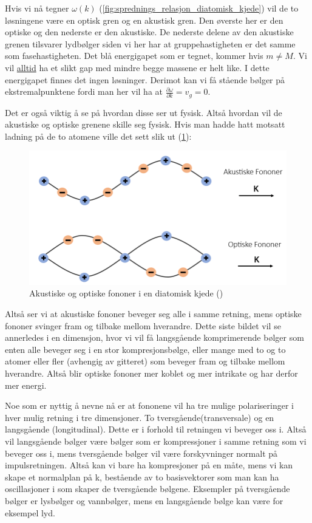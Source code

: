 \documentclass{article}
\begin{document}
Hvis vi nå tegner $\omega(k)$ (\ref{fig:sprednings_relasjon_diatomisk_kjede}) vil de to løsningene være en optisk gren og en akustisk gren. Den øverste her er den optiske og den nederste er den akustiske. De nederste delene av den akustiske grenen tilsvarer lydbølger siden vi her har at gruppehastigheten er det samme som fasehastigheten. Det blå energigapet som er tegnet, kommer hvis $m \ne M$. Vi vil \underline{alltid} ha et slikt gap med mindre begge massene er helt like. I dette energigapet finnes det ingen løsninger. Derimot kan vi få stående bølger på ekstremalpunktene fordi man her vil ha at $\frac{\partial \omega}{\partial k} = v_g = 0$.

Det er også viktig å se på hvordan disse ser ut fysisk. Altså hvordan vil de akustiske og optiske grenene skille seg fysisk. Hvis man hadde hatt motsatt ladning på de to atomene ville det sett slik ut (\ref{fig:akustiske_og_optiske_fononer_diatomisk_kjede}):
\begin{figure}[H]
    \centering
    \includegraphics[width=0.5\linewidth]{bilder/akustiske_og_optiske_fononer_diatomisk_kjede.png}
    \caption{Akustiske og optiske fononer i en diatomisk kjede (\cite{researchgate_phonon_modes})}
    \label{fig:akustiske_og_optiske_fononer_diatomisk_kjede}
\end{figure}
Altså ser vi at akustiske fononer beveger seg alle i samme retning, mens optiske fononer svinger fram og tilbake mellom hverandre. Dette siste bildet vil se annerledes i en dimensjon, hvor vi vil få langsgående komprimerende bølger som enten alle beveger seg i en stor kompresjonsbølge, eller mange med to og to atomer eller fler (avhengig av gitteret) som beveger fram og tilbake mellom hverandre. Altså blir optiske fononer mer koblet og mer intrikate og har derfor mer energi.

Noe som er nyttig å nevne nå er at fononene vil ha tre mulige polariseringer i hver mulig retning i tre dimensjoner. To tversgående(transversale) og en langsgående (longitudinal). Dette er i forhold til retningen vi beveger oss i. Altså vil langsgående bølger være bølger som er kompressjoner i samme retning som vi beveger oss i, mens tversgående bølger vil være forskyvninger normalt på impulsretningen. Altså kan vi bare ha kompresjoner på en måte, mens vi kan skape et normalplan på k, bestående av to basisvektorer som man kan ha oscillasjoner i som skaper de tversgående bølgene. Eksempler på tversgående bølger er lysbølger og vannbølger, mens en langsgående bølge kan være for eksempel lyd.
\end{document}
